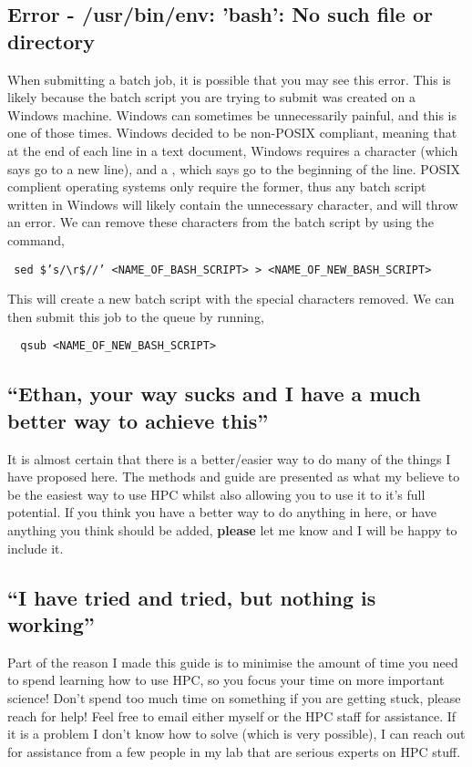\subsection{Error - /usr/bin/env: 'bash': No such file or directory}
%
When submitting a batch job, it is possible that you may see this error. This is likely because the batch script you are trying to submit was created on a Windows machine. Windows can sometimes be unnecessarily painful, and this is one of those times. Windows decided to be non-POSIX compliant, meaning that at the end of each line in a text document, Windows requires a  character (which says go to a new line), and a , which says go to the beginning of the line. POSIX complient operating systems only require the former, thus any batch script written in Windows will likely contain the unnecessary  character, and will throw an error. We can remove these characters from the batch script by using the command,
%
%
\begin{verbatim}
 sed $’s/\r$//’ <NAME_OF_BASH_SCRIPT> > <NAME_OF_NEW_BASH_SCRIPT>
\end{verbatim}
%
%
%
This will create a new batch script with the special characters removed. We can then submit this job to the queue by running,

\begin{verbatim}
  qsub <NAME_OF_NEW_BASH_SCRIPT>
\end{verbatim}
%
%
%
%
\subsection{``Ethan, your way sucks and I have a much better way to achieve this''}
%
%
It is almost certain that there is a better/easier way to do many of the things I have proposed here. The methods and guide are presented as what my believe to be the easiest way to use HPC whilst also allowing you to use it to it's full potential. If you think you have a better way to do anything in here, or have anything you think should be added, \textbf{please} let me know and I will be happy to include it.
%
%
\subsection{``I have tried and tried, but nothing is working''}
%
%
Part of the reason I made this guide is to minimise the amount of time you need to spend learning how to use HPC, so you focus your time on more important science! Don't spend too much time on something if you are getting stuck, please reach for help! Feel free to email either myself or the HPC staff for assistance. If it is a problem I don't know how to solve (which is very possible), I can reach out for assistance from a few people in my lab that are serious experts on HPC stuff.
%
%
